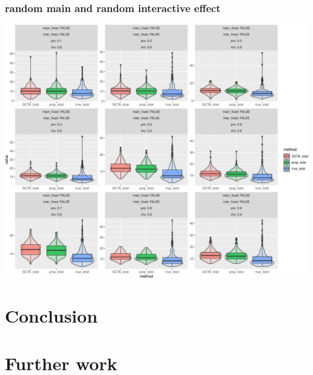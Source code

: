 \documentclass[]{article}
\begin{document}
\subsubsection{random main and random interactive
effect}\label{random-main-and-random-interactive-effect-1}

\includegraphics{Simulation_report_chi_resamle_files/figure-latex/random random decorr main-1.pdf}

\section{Conclusion}\label{conclusion}

\section{Further work}\label{further-work}
\end{document}
